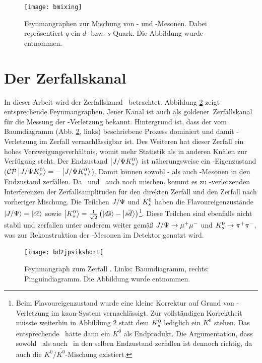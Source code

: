 \begin{figure}[hptb]
\centering
\texttt{[image: bmixing]}
\caption{Feynmangraphen zur Mischung von \Bd- und \Bdbar-Mesonen. Dabei repräsentiert $q$ ein $d$- bzw. $s$-Quark. Die Abbildung wurde \cite{roadmap} entnommen.}
\label{fig:bmixing}
\end{figure}


\section[Der Zerfallskanal \Decaychannel]{Der Zerfallskanal \boldmath\Decaychannel\unboldmath}
In dieser Arbeit wird der Zerfallskanal \Decaychannel\ betrachtet. Abbildung \ref{fig:decay} zeigt entsprechende Feynmangraphen. Jener Kanal ist auch als \glqq goldener\grqq\ Zerfallskanal für die Messung der \CP-Verletzung bekannt. Hintergrund ist, dass der vom Baumdiagramm (Abb. \ref{fig:decay}, links) beschriebene Prozess dominiert und damit \CP-Verletzung im Zerfall vernachlässigbar ist. Des Weiteren hat dieser Zerfall ein hohes Verzweigungsverhältnis, womit mehr Statistik als in anderen Knälen zur Verfügung steht. Der Endzustand $\Ket{J/\Psi K_s^0}$ ist näherungsweise ein \CP-Eigenzustand ($\text{$\mathcal{CP}$}\Ket{J/\Psi K_s^0} = - \Ket{J/\Psi K_s^0}$). Damit können sowohl \Bd- als auch \Bdbar-Mesonen in den Endzustand zerfallen. Da \Bd\ und \Bdbar\ auch noch mischen, kommt es zu \CP-verletzenden Interferenzen der Zerfallsamplituden für den direkten Zerfall und den Zerfall nach vorheriger Mischung. Die Teilchen $J/\Psi$ und $K_s^0$ haben die Flavoureigenzustände $\Ket{J/\Psi} = \Ket{c\overline{c}}$ sowie $\Ket{K_s^0} = \tfrac{1}{\sqrt{2}}\left(\Ket{d\overline{s}}-\Ket{s\overline{d}}\right)$\footnote{Beim Flavoureigenzustand wurde eine kleine Korrektur auf Grund von \CP-Verletzung im kaon-System vernachlässigt. Zur vollständigen Korrektheit müsste weiterhin in Abbildung \ref{fig:decay} statt dem $K_s^0$ lediglich ein $K^0$ stehen. Das entsprechende \Bdbar\ hätte dann ein $\overline{K^0}$ als Endprodukt. Die Argumentation, dass sowohl \Bd\ als auch \Bdbar\ in den selben Endzustand zerfallen ist dennoch richtig, da auch die $K^0/\overline{K^0}$-Mischung existiert.}. Diese Teilchen sind ebenfalls nicht stabil und zerfallen unter anderem weiter gemäß $J/\Psi \rightarrow \mu^+\mu^-$ und $K_s^0 \rightarrow \pi^+\pi^-$, was zur Rekonstruktion der \Bd-Mesonen im Detektor genutzt wird.

\begin{figure}[hptb]
\centering
\texttt{[image: bd2jpsikshort]}
\caption{Feynmangraph zum Zerfall \Decaychannel. Links: Baumdiagramm, rechts: Pinguindiagramm. Die Abbildung wurde \cite{lhcb-paper} entnommen.}
\label{fig:decay}
\end{figure}

